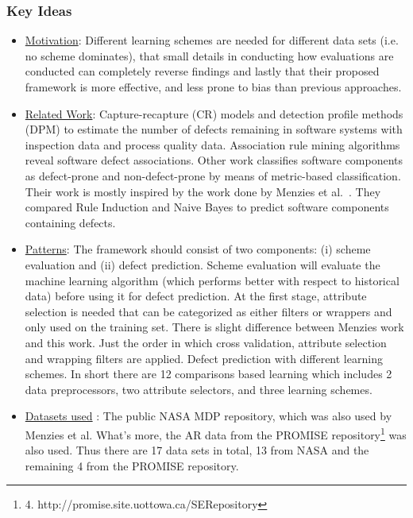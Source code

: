 \documentclass[conference]{IEEEtran}
\begin{document}
\subsubsection{\textbf{Key Ideas}}
\begin{itemize}
    \item \underline{Motivation}: Different learning schemes are needed for different data sets (i.e. no scheme dominates), that small details in conducting how evaluations are conducted can completely reverse findings and lastly that their proposed framework is more effective, and less prone to bias than previous approaches.
    \item \underline{Related Work}: Capture-recapture (CR) models and detection profile methods (DPM) to estimate the number of defects remaining in software systems with inspection data and process quality data. Association rule mining algorithms reveal software defect associations. Other work classifies software components as defect-prone and non-defect-prone by means of metric-based classification. Their work is mostly inspired by the work done by Menzies et al.~\cite{menzies2007data}. They compared Rule Induction and Naive Bayes to predict software components containing defects.
    \item \underline{Patterns}: The framework should consist of two components: (i) scheme evaluation and (ii) defect prediction. Scheme evaluation will evaluate the machine learning algorithm (which performs better with respect to historical data) before using it for defect prediction. At the first stage, attribute selection is needed that can be categorized as either filters or wrappers and only used on the training set. There is slight difference between Menzies work and this work. Just the order in which cross validation, attribute selection and wrapping filters are applied. Defect prediction with different learning schemes. In short there are 12 comparisons based learning which includes 2 data preprocessors, two attribute selectors, and three learning schemes.
    \item \underline{Datasets used} : The public NASA MDP repository, which was also used by Menzies et al. What’s more, the AR data from the PROMISE repository\footnote{4. http://promise.site.uottowa.ca/SERepository} was also used. Thus there are 17 data sets in total, 13 from NASA and the remaining 4 from the PROMISE repository.
\end{itemize}
\end{document}
